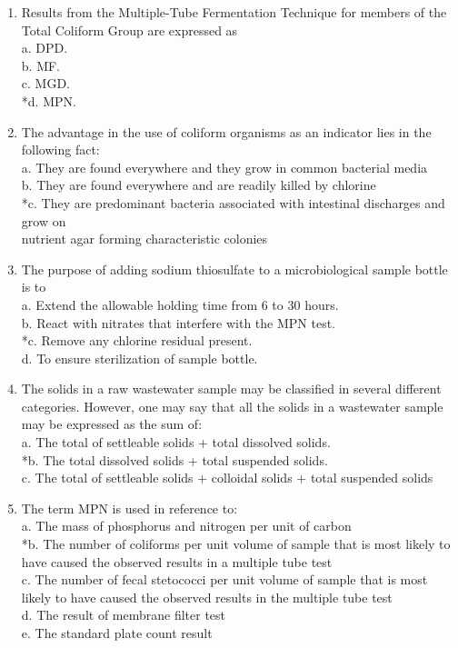 \begin{enumerate}
\item Results from the Multiple-Tube Fermentation Technique for members of the Total Coliform Group are expressed as \\

a. DPD. \\
b. MF. \\
c. MGD. \\
*d. MPN. 

\item The advantage in the use of coliform organisms as an indicator lies in the following fact: \\

a. They are found everywhere and they grow in common bacterial media \\
b. They are found everywhere and are readily killed by chlorine \\
*c. They are predominant bacteria associated with intestinal discharges and grow on\\
nutrient agar forming characteristic colonies 

\item The purpose of adding sodium thiosulfate to a microbiological sample bottle is to \\

a. Extend the allowable holding time from 6 to 30 hours. \\
b. React with nitrates that interfere with the MPN test. \\
*c. Remove any chlorine residual present. \\
d. To ensure sterilization of sample bottle. 

\item The solids in a raw wastewater sample may be classified in several different categories. However, one may say that all the solids in a wastewater sample may be expressed as the sum of: \\

a. The total of settleable solids + total dissolved solids. \\
*b. The total dissolved solids + total suspended solids. \\
c. The total of settleable solids + colloidal solids + total suspended solids 

\item The term MPN is used in reference to: \\

a. The mass of phosphorus and nitrogen per unit of carbon \\
*b. The number of coliforms per unit volume of sample that is most likely to have caused the observed results in a multiple tube test \\
c. The number of fecal stetococci per unit volume of sample that is most likely to have caused the observed results in the multiple tube test \\
d. The result of membrane filter test \\
e. The standard plate count result 


\end{enumerate}
